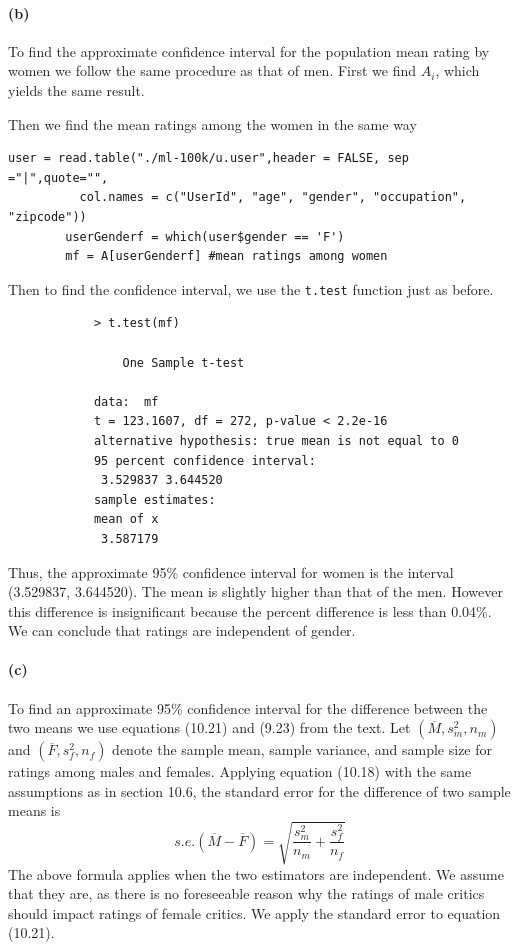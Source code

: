 \documentclass[fleqn]{article}
\begin{document}
	\paragraph{(b)}
		To find the approximate confidence interval for the population mean rating by women we follow the same procedure as that of men. First we find $A_i$, which yields the same result.

		Then we find the mean ratings among the women in the same way
		\begin{verbatim}user = read.table("./ml-100k/u.user",header = FALSE, sep ="|",quote="", 
		  col.names = c("UserId", "age", "gender", "occupation", "zipcode"))
		userGenderf = which(user$gender == 'F')
		mf = A[userGenderf]	#mean ratings among women\end{verbatim}

		Then to find the confidence interval, we use the \texttt{t.test} function just as before.
		\begin{verbatim}
			> t.test(mf)

				One Sample t-test

			data:  mf
			t = 123.1607, df = 272, p-value < 2.2e-16
			alternative hypothesis: true mean is not equal to 0
			95 percent confidence interval:
			 3.529837 3.644520
			sample estimates:
			mean of x 
			 3.587179 
		\end{verbatim}
		Thus, the approximate 95\% confidence interval for women is the interval (3.529837, 3.644520). The mean is slightly higher than that of the men. However this difference is insignificant because the percent difference is less than 0.04\%. We can conclude that ratings are independent of gender.

	\paragraph{(c)}
		To find an approximate 95\% confidence interval for the difference between the two means we use equations (10.21) and (9.23) from the text.
		Let \((\overline{M}, s_m^2, n_m)\) and \((\overline{F}, s_f^2, n_f)\) denote the sample mean, sample variance, and sample size for ratings among males and females. Applying equation (10.18) with the same assumptions as in section 10.6, the standard error for the difference of two sample means is 
		\[s.e.(\overline{M} - \overline{F}) = \sqrt{\frac{s_m^2}{n_m} + \frac{s_f^2}{n_f}} \tag{10.18}\]
		The above formula applies when the two estimators are independent. We assume that they are, as there is no foreseeable reason why the ratings of male critics should impact ratings of female critics. We apply the standard error to equation (10.21).
\end{document}
